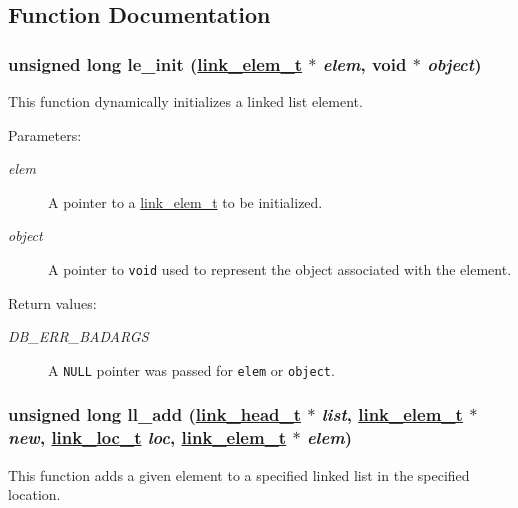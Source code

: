 \subsection{Function Documentation}
\hypertarget{group__dbprim__link_a12}{
\subsubsection[le\_\-init]{\setlength{\rightskip}{0pt plus 5cm}unsigned long le\_\-init (\hyperlink{dbprim_8h_a1}{link\_\-elem\_\-t} $\ast$ {\em elem}, void $\ast$ {\em object})}}
\label{group__dbprim__link_a12}


This function dynamically initializes a linked list element.

\begin{Desc}
\item[Parameters:]
\begin{description}
\item[{\em elem}]A pointer to a \hyperlink{group__dbprim__link_a1}{link\_\-elem\_\-t} to be initialized. \item[{\em object}]A pointer to {\tt void} used to represent the object associated with the element.\end{description}
\end{Desc}
\begin{Desc}
\item[Return values:]
\begin{description}
\item[{\em DB\_\-ERR\_\-BADARGS}]A {\tt NULL} pointer was passed for {\tt elem} or {\tt object}. \end{description}
\end{Desc}
\hypertarget{group__dbprim__link_a6}{
\subsubsection[ll\_\-add]{\setlength{\rightskip}{0pt plus 5cm}unsigned long ll\_\-add (\hyperlink{dbprim_8h_a0}{link\_\-head\_\-t} $\ast$ {\em list}, \hyperlink{dbprim_8h_a1}{link\_\-elem\_\-t} $\ast$ {\em new}, \hyperlink{dbprim_8h_a4}{link\_\-loc\_\-t} {\em loc}, \hyperlink{dbprim_8h_a1}{link\_\-elem\_\-t} $\ast$ {\em elem})}}
\label{group__dbprim__link_a6}


This function adds a given element to a specified linked list in the specified location.

